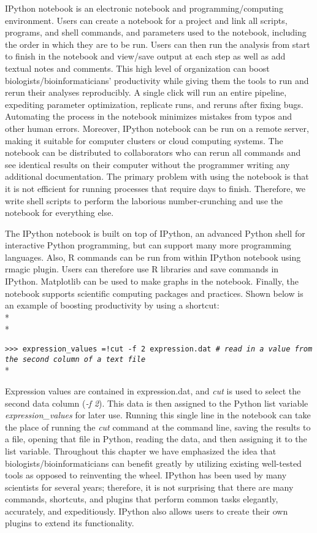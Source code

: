 \documentclass[ChapterTOCs,krantz2]{krantz} %
\begin{document}
IPython notebook is an
electronic notebook and programming/computing environment.  
Users can create a notebook for a project and link all scripts,
programs, and shell commands, and parameters used to the notebook, including
the order in which they are to be run.  Users can then run the analysis from start to
finish in the notebook and view/save output at each step as well as add textual
notes and comments.   This high level of organization can boost
biologists/bioinformaticians' productivity while giving them the tools to run
and rerun their analyses reproducibly.  A single click will run an entire
pipeline, expediting parameter optimization, replicate runs, and reruns after
fixing bugs.  Automating the process in the notebook minimizes mistakes from
typos and other human errors.  Moreover, IPython notebook can be run on a
remote server, making it suitable for computer clusters or
cloud computing systems. The notebook can be distributed to
collaborators who can rerun all commands and see identical results on their
computer without the programmer writing any additional documentation.
The primary problem with using the notebook is that it is not efficient
for running processes that require days to finish.  Therefore, we write
shell scripts to perform the laborious number-crunching and use the notebook
for everything else.

The IPython notebook is built on top of IPython, an advanced Python shell for
interactive Python programming, but can support many more programming
languages.  Also, R commands can be run from within IPython notebook using
rmagic plugin. 
Users can therefore use R libraries and save commands in IPython.
Matplotlib can be used to make graphs in the notebook.  
Finally, the notebook supports scientific computing packages and practices. 
Shown below is an example of boosting productivity by using a shortcut:\\*\\*

\texttt{>>> expression\_values =!cut -f 2 expression.dat \emph{\# read in a
value from the second column of a text file}}\\*

Expression values are contained in expression.dat, and 
\emph{cut} is used to select the second data
column (\emph{-f 2}).  This data is then assigned to the Python list variable
\emph{expression\_values} for later use.  Running this single line in
the notebook can take the place of running the \emph{cut} command at the command line,
saving the results to a file, opening that file in Python, reading the data,
and then assigning it to the list variable.  Throughout this chapter we have
emphasized the idea that biologists/bioinformaticians can benefit greatly by
utilizing existing well-tested tools as opposed to reinventing the wheel.
IPython has been used by many scientists for several years; therefore, it is
not surprising that there are many commands, shortcuts, and plugins that
perform common tasks elegantly, accurately, and expeditiously.  
IPython also allows users to
create their own plugins to extend its functionality.
\end{document}
